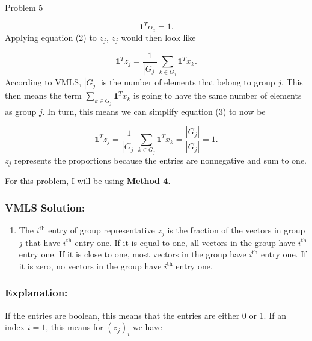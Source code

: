 \begin{problem}{Problem 5}
\begin{Highlight}
        \begin{equation}
            \mathbf{1}^{T}\alpha_{i} = 1.
        \end{equation}
        Applying equation (2) to $z_{j}$, $z_{j}$ would then look like

        \begin{equation}
            \mathbf{1}^{T}z_{j} = \frac{1}{|G_{j}|} \sum_{k \in G_{j}} \mathbf{1}^{T}x_{k}.
        \end{equation}
        According to VMLS, $|G_{j}|$ is the number of elements that belong to group $j$. This then means the term $\sum_{k \in G_{j}} \mathbf{1}^{T}x_{k}$ is going to have the same number of elements
        as group $j$. In turn, this means we can simplify equation (3) to now be

        \begin{equation}
            \mathbf{1}^{T}z_{j} = \frac{1}{|G_{j}|} \sum_{k \in G_{j}} \mathbf{1}^{T}x_{k} = \frac{|G_{j}|}{|G_{j}|} = 1.
        \end{equation}
        $z_{j}$ represents the proportions because the entries are nonnegative and sum to one.
    \end{Highlight}

    \begin{Highlight}
        \noindent For this problem, I will be using \textbf{Method 4}. 

        \subsubsection*{VMLS Solution:}

        \begin{enumerate}[label = (\alph*), start = 3]
            \item The $i^{\text{th}}$ entry of group representative $z_{j}$ is the fraction of the vectors in group $j$ that have $i^{\text{th}}$ entry one. If it is equal to one, all vectors in the group 
            have $i^{\text{th}}$ entry one. If it is close to one, most vectors in the group have $i^{\text{th}}$ entry one. If it is zero, no vectors in the group have $i^{\text{th}}$ entry one.
        \end{enumerate}

        \subsubsection*{Explanation:}

        If the entries are boolean, this means that the entries are either 0 or 1. If an index $i = 1$, this means for $(z_{j})_{i}$ we have 


\end{Highlight}
\end{problem}
